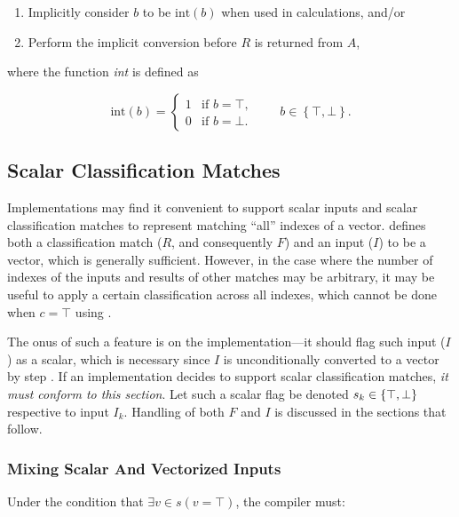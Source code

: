 \begin{enumerate}
  \item
  Implicitly consider $b$ to be $\textrm{int}\!\left(b\right)$ when used in
  calculations, and/or

  \item
  Perform the implicit conversion before $R$ is returned from $A$,
\end{enumerate}

where the function {\sl int} is defined as

$$
  \textrm{int}(b) = \left\{
    \begin{array}{ll}
      1 & \textrm{if }b = \top, \\
      0 & \textrm{if }b = \bot.
    \end{array}
  \right.\qquad
  b \in \left\{\top,\bot\right\}.
$$


\subsection{Scalar Classification Matches}
\label{s:cmatch-scalar}
Implementations may find it convenient to support scalar inputs and scalar
classification matches to represent matching ``all'' indexes of a vector.
 defines both a classification match ($R$, and consequently $F$)
and an input ($I$) to be a vector, which is generally sufficient. However, in
the case where the number of indexes of the inputs and results of other matches
may be arbitrary, it may be useful to apply a certain classification across all
indexes, which cannot be done when $c = \top$ using .

The onus of such a feature is on the implementation---it should flag such input
($I$) as a scalar, which is necessary since $I$ is unconditionally converted to
a vector by step . If an implementation decides
to support scalar classification matches, \emph{it must conform to this
section}.  Let such a scalar flag be denoted $s_k \inbool$ respective to input
$I_k$.  Handling of both $F$ and $I$ is discussed in the sections that follow.

\subsubsection{Mixing Scalar And Vectorized Inputs}
\label{s:cmatch-scalar-mixed}
Under the condition that $\exists v\in s(v=\top)$, the compiler must:

\begingroup
  \def\siset{k \in\set{j : s_j = \top}}


